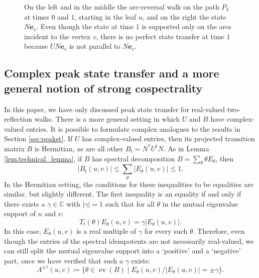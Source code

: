 \documentclass{article}
\numberwithin{equation}{section}
\DeclareMathOperator\ev{ev}
\newcommand\cx{{\mathbb C}}%
\newcommand\Ze{{\mathbf e}}
\begin{document}
\begin{figure}[htb]
    \caption{On the left and in the middle the arc-reversal walk on the path $P_3$ at times $0$ and $1$, starting in the leaf $u$, and on the right the state $N\Ze_v$. Even though the state at time $1$ is supported only on the arcs incident to the vertex $v$, there is no perfect state transfer at time $1$ because $UN\Ze_v$ is not parallel to $N\Ze_v$. \label{fig:altPST_arc_reversal_path}}
\end{figure}


\subsection*{Complex peak state transfer and a more general notion of strong cospectrality}

In this paper, we have only discussed peak state transfer for real-valued two-reflection walks. There is a more general setting in which $U$ and $B$ have complex-valued entries. It is possible to formulate complex analogues to the results in Section \ref{sec:peakst}. If $U$ has complex-valued entries, then its projected transition matrix $B$ is Hermitian, as are all other $B_t = N^* U^t N$. As in Lemma \ref{lem:technical_lemma}, if $B$ has spectral decomposition $B = \sum_\theta \theta E_{\theta}$, then
\[
|B_t(u,v)| \leq \sum_\theta |E_\theta(u,v)| \leq 1.
\]
In the Hermitian setting, the conditions for these inequalities to be equalities are similar, but slightly different. The first inequality is an equality if and only if there exists a $\gamma \in \cx$ with $|\gamma| = 1$ such that for all $\theta$ in the mutual eigenvalue support of $u$ and $v$:
\[
T_t(\theta) E_\theta(u,v) = \gamma |E_\theta(u,v)|.
\]
In this case, $E_\theta(u,v)$ is a real multiple of $\gamma$ for every such $\theta$. Therefore, even though the entries of the spectral idempotents are not necessarily real-valued, we can still split the mutual eigenvalue support into a `positive' and a `negative' part, once we have verified that such a $\gamma$ exists:
\[
\Lambda^{\pm \gamma}(u,v) \coloneq \{\theta \in \ev(B) \mid E_\theta(u,v)/|E_\theta(u,v)| = \pm \gamma\}.
\]
\end{document}
